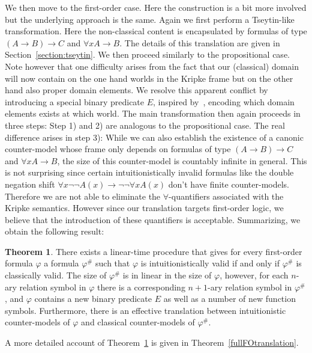 \documentclass[a4paper,11pt]{report}
\theoremstyle{definition}
\newtheorem{theorem}{Theorem}[section]
\theoremstyle{definition}
\theoremstyle{definition}
\theoremstyle{definition}
\theoremstyle{definition}
\theoremstyle{definition}
\theoremstyle{definition}
\begin{document}
	We then move to the first-order case. Here the construction is a bit more involved but the underlying approach is the same.
	Again we first perform a Tseytin-like transformation.
	Here the non-classical content is encapsulated by formulas of type $(A\to B)\to C$ and $\forall xA\to B$.
	The details of this translation are given in Section~\ref{section:tseytin}.
	We then proceed similarly to the propositional case.
	Note however that one difficulty arises from the fact that our (classical) domain will now contain on the one hand worlds in the Kripke frame but on the other hand also proper domain elements.
	We resolve this apparent conflict by introducing a special binary predicate $E$, inspired by~\cite{iemhoff2010eskolemization}, encoding which domain elements exists at which world.
	The main transformation then again proceeds in three steps:
	Step 1) and 2) are analogous to the propositional case.
	The real difference arises in step 3):
	While we can also establish the existence of a canonic counter-model whose frame only depends on formulas of type $(A\to B)\to C$ and $\forall xA\to B$, the size of this counter-model is countably infinite in general.
	This is not surprising since certain intuitionistically invalid formulas like the double negation shift $\forall x\neg\neg A(x)\to \neg\neg\forall x A(x)$ don't have finite counter-models.
	Therefore we are not able to eliminate the $\forall$-quantifiers associated with the Kripke semantics.
	However since our translation targets first-order logic, we believe that the introduction of these quantifiers is acceptable.
	Summarizing, we obtain the following result:
	
	\begin{theorem}
		\label{thm:reduction-first-order-short}
		There exists a linear-time procedure that gives for every first-order formula $\varphi$ a formula $\varphi^\#$ such that $\varphi$ is intuitionistically valid if and only if $\varphi^\#$ is classically valid. The size of $\varphi^\#$ is in linear in the size of $\varphi$, however, for each $n$-ary relation symbol in $\varphi$ there is a corresponding $n+1$-ary relation symbol in $\varphi^\#$, and $\varphi$ contains a new binary predicate $E$ as well as a number of new function symbols. Furthermore, there is an effective translation between intuitionistic counter-models of $\varphi$ and classical counter-models of $\varphi^\#$.
	\end{theorem}
	A more detailed account of Theorem~\ref{thm:reduction-first-order-short} is given in Theorem~\ref{fullFOtranslation}.
	
\end{document}
